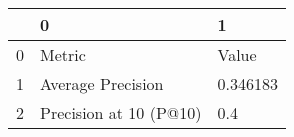 \begin{tabular}{lll}
\toprule
{} &                       0 &         1 \\
\midrule
0 &                  Metric &     Value \\
1 &       Average Precision &  0.346183 \\
2 &  Precision at 10 (P@10) &       0.4 \\
\bottomrule
\end{tabular}
